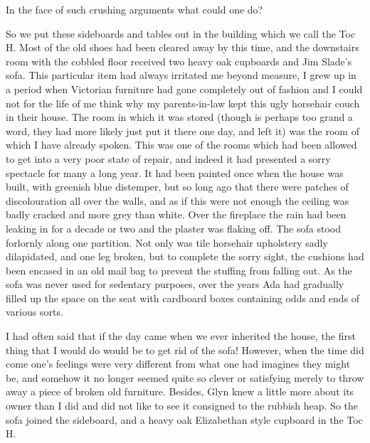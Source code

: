 In the face of such crushing arguments what could one do?

So we put these sideboards and tables out in the building which we call the Toc H. Most of the old shoes had been cleared away by this time, and the downstairs room with the cobbled floor received two heavy oak cupboards and Jim Slade's sofa. This particular item had always irritated me beyond measure, I grew up in a period when Victorian furniture had gone completely out of fashion and I could not for the life of me think why my parents-in-law kept this ugly horsehair couch in their house. The room in which it was stored (though  is perhaps too grand a word, they had more likely just put it there one day, and left it) was the  room of which I have already spoken. This was one of the rooms which had been allowed to get into a very poor state of repair, and indeed it had presented a sorry spectacle for many a long year. It had been painted once when the house was built, with greenish blue distemper, but so long ago that there were patches of discolouration all over the walls, and as if this were not enough the ceiling was badly cracked and more grey than white. Over the fireplace the rain had been leaking in for a decade or two and the plaster was flaking off. The sofa stood forlornly along one partition. Not only was tile horsehair upholstery sadly dilapidated, and one leg broken, but to complete the sorry sight, the cushions had been encased in an old mail bag to prevent the stuffing from falling out. As the sofa was never used for sedentary purposes, over the years Ada had gradually filled up the space on the seat with cardboard boxes containing odds and ends of various sorts.

I had often said that if the day came when we ever inherited the house, the first thing that I would do would be to get rid of the sofa! However, when the time did come one's feelings were very different from what one had imagines they might be, and somehow it no longer seemed quite so clever or satisfying merely to throw away a piece of broken old furniture. Besides, Glyn knew a little more about its owner than I did and did not like to see it consigned to the rubbish heap. So the sofa joined the sideboard, and a heavy oak Elizabethan style cupboard in the Toc H.

